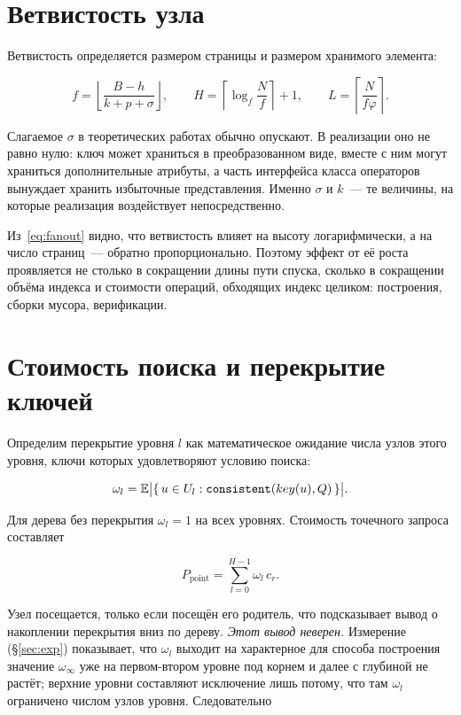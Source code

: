 \section{Ветвистость узла}

Ветвистость определяется размером страницы и размером хранимого элемента:

\begin{equation}
\label{eq:fanout}
f = \left\lfloor \frac{B-h}{k+p+\sigma} \right\rfloor ,
\qquad
H = \left\lceil \log_f \frac{N}{f} \right\rceil + 1,
\qquad
L = \left\lceil \frac{N}{f\varphi} \right\rceil .
\end{equation}

Слагаемое $\sigma$ в теоретических работах обычно опускают. В реализации оно не
равно нулю: ключ может храниться в преобразованном виде, вместе с ним могут
храниться дополнительные атрибуты, а часть интерфейса класса операторов
вынуждает хранить избыточные представления. Именно $\sigma$ и $k$~--- те
величины, на которые реализация воздействует непосредственно.

Из~\eqref{eq:fanout} видно, что ветвистость влияет на высоту логарифмически, а
на число страниц~--- обратно пропорционально. Поэтому эффект от её роста
проявляется не столько в сокращении длины пути спуска, сколько в сокращении
объёма индекса и стоимости операций, обходящих индекс целиком: построения,
сборки мусора, верификации.

\section{Стоимость поиска и перекрытие ключей}

Определим перекрытие уровня $l$ как математическое ожидание числа узлов этого
уровня, ключи которых удовлетворяют условию поиска:

\begin{equation}
\label{eq:omega}
\omega_l = \mathbb{E}\bigl|\{\,u \in U_l : \texttt{consistent}(key(u), Q)\,\}\bigr| .
\end{equation}

Для дерева без перекрытия $\omega_l = 1$ на всех уровнях. Стоимость точечного
запроса составляет

\begin{equation}
\label{eq:point}
P_{\text{point}} = \sum_{l=0}^{H-1} \omega_l \, c_r .
\end{equation}

Узел посещается, только если посещён его родитель, что подсказывает вывод о
накоплении перекрытия вниз по дереву. \emph{Этот вывод неверен.} Измерение
(§\ref{sec:exp}) показывает, что $\omega_l$ выходит на характерное для способа
построения значение $\omega_\infty$ уже на первом-втором уровне под корнем и
далее с глубиной не растёт; верхние уровни составляют исключение лишь потому,
что там $\omega_l$ ограничено числом узлов уровня. Следовательно

